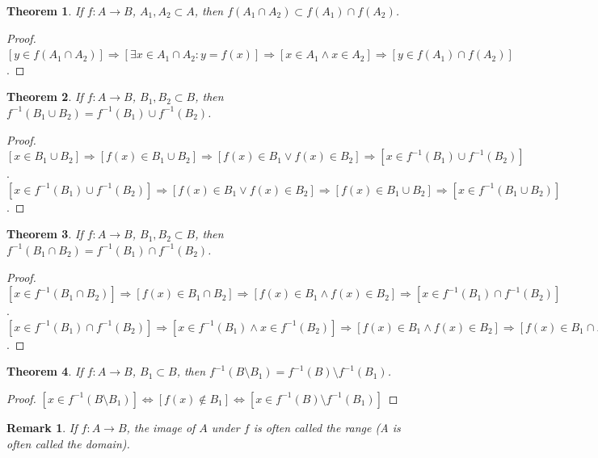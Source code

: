 \documentclass[12pt,oneside]{book}
\theoremstyle{mystyle}
\newtheorem{theorem}{Theorem}[section]
\newtheorem{remark}{Remark}[section]
\begin{document}
\begin{theorem}
If $f:A\rightarrow B$, $A_1,A_2\subset A$, then $f(A_1\cap A_2)\subset f(A_1)\cap f(A_2)$.
\end{theorem}
\begin{proof}
$[y\in f(A_1 \cap A_2)]\Rightarrow [\exists x\in A_1 \cap A_2:y=f(x)]\Rightarrow [x\in A_1 \land x \in A_2] \Rightarrow[y \in f(A_1)\cap f(A_2)]$.
\end{proof}

\begin{theorem}
If $f:A\rightarrow B$, $B_1,B_2\subset B$, then $f^{-1}(B_1\cup B_2) = f^{-1}(B_1)\cup f^{-1}(B_2)$.
\end{theorem}
\begin{proof}
$[x\in B_1\cup B_2]\Rightarrow [f(x)\in B_1\cup B_2]\Rightarrow [f(x)\in B_1\lor f(x)\in B_2]\Rightarrow [x\in f^{-1}(B_1)\cup f^{-1}(B_2)]$. $[x \in f^{-1}(B_1)\cup f^{-1}(B_2)]\Rightarrow [f(x)\in B_1\lor f(x) \in B_2]\Rightarrow [f(x) \in B_1\cup B_2]\Rightarrow [x\in f^{-1}(B_1\cup B_2)]$.
\end{proof}

\begin{theorem}
If $f:A\rightarrow B$, $B_1,B_2\subset B$, then $f^{-1}(B_1\cap B_2) = f^{-1}(B_1)\cap f^{-1}(B_2)$.
\end{theorem}
\begin{proof}
$[x\in f^{-1}(B_1\cap B_2)]\Rightarrow [f(x) \in B_1 \cap B_2]\Rightarrow [f(x)\in B_1\land f(x) \in B_2 ]\Rightarrow [x\in f^{-1}(B_1)\cap f^{-1}(B_2)]$. $[x\in f^{-1}(B_1)\cap f^{-1}(B_2)]\Rightarrow [x\in f^{-1}(B_1)\land x\in f^{-1}(B_2)]\Rightarrow [f(x) \in B_1\land f(x) \in B_2]\Rightarrow [f(x)\in B_1\cap B_2]\Rightarrow [x\in f^{-1}(B_1\cap B_2)]$.
\end{proof}

\begin{theorem}
If $f:A\rightarrow B$, $B_1 \subset B$, then $f^{-1}(B\setminus B_1) = f^{-1}(B)\setminus f^{-1}(B_1)$.
\end{theorem}
\begin{proof}
$[x\in f^{-1}(B\setminus B_1)]\Leftrightarrow [f(x)\notin B_1]\Leftrightarrow [x\in f^{-1}(B)\setminus f^{-1}(B_1)]$
\end{proof}

\begin{remark}
If $f:A\rightarrow B$, the image of $A$ under $f$ is often called the range (A is often called the domain).
\end{remark}
\end{document}
